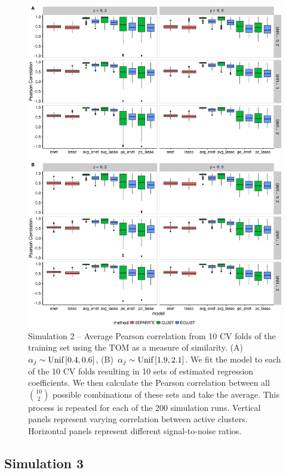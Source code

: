 \begin{appendices}
\begin{figure}[H]
	\centering
	\includegraphics[scale=0.55, keepaspectratio]{./figs/hydra/results/figures/sim2-sept8/pearson_TOM_sim2.png}
	\caption{Simulation 2 -- Average Pearson correlation from 10 CV folds of the training set using the TOM as a measure of similarity. \mbox{(A) $\alpha_{j} \sim \textrm{{Unif}}\left[0.4, 0.6\right]$}, \mbox{(B) $\alpha_{j} \sim \textrm{{Unif}}\left[1.9, 2.1\right]$}. We fit the model to each of the 10 CV folds resulting in 10 sets of estimated regression coefficients. We then calculate the Pearson correlation between all $\binom{10}{2}$ possible combinations of these sets and take the average. This process is repeated for each of the 200 simulation runs. Vertical panels represent varying correlation between active clusters. Horizontal panels represent different signal-to-noise ratios.}
	\label{fig:pearson_TOM_sim2}
\end{figure}




\subsection*{Simulation 3}


\end{appendices}
